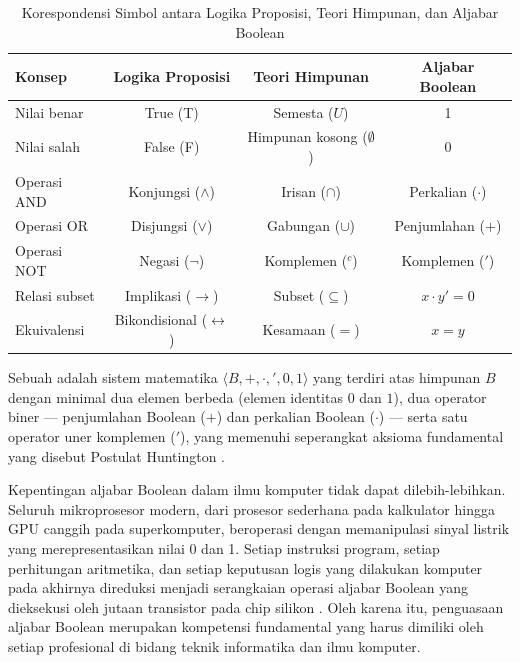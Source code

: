 \begin{table}[htbp]
\centering
\renewcommand{\arraystretch}{1.3}
\begin{tabular}{|l|c|c|c|}
\hline
\textbf{Konsep} & \textbf{Logika Proposisi} & \textbf{Teori Himpunan} & \textbf{Aljabar Boolean} \\ \hline
Nilai benar & True (T) & Semesta ($U$) & 1 \\ \hline
Nilai salah & False (F) & Himpunan kosong ($\emptyset$) & 0 \\ \hline
Operasi AND & Konjungsi ($\wedge$) & Irisan ($\cap$) & Perkalian ($\cdot$) \\ \hline
Operasi OR & Disjungsi ($\vee$) & Gabungan ($\cup$) & Penjumlahan ($+$) \\ \hline
Operasi NOT & Negasi ($\neg$) & Komplemen ($^c$) & Komplemen ($'$) \\ \hline
Relasi subset & Implikasi ($\rightarrow$) & Subset ($\subseteq$) & $x \cdot y' = 0$ \\ \hline
Ekuivalensi & Bikondisional ($\leftrightarrow$) & Kesamaan ($=$) & $x = y$ \\ \hline
\end{tabular}
\caption{Korespondensi Simbol antara Logika Proposisi, Teori Himpunan, dan Aljabar Boolean}
\label{tab:korespondensi-tiga-sistem}
\end{table}

\begin{definisi}
Sebuah  adalah sistem matematika $\langle B, +, \cdot, ', 0, 1 \rangle$ yang terdiri atas himpunan $B$ dengan minimal dua elemen berbeda (elemen identitas $0$ dan $1$), dua operator biner --- penjumlahan Boolean ($+$) dan perkalian Boolean ($\cdot$) --- serta satu operator uner komplemen ($'$), yang memenuhi seperangkat aksioma fundamental yang disebut Postulat Huntington \cite{rosen2019}.
\end{definisi}

Kepentingan aljabar Boolean dalam ilmu komputer tidak dapat dilebih-lebihkan. Seluruh mikroprosesor modern, dari prosesor sederhana pada kalkulator hingga GPU canggih pada superkomputer, beroperasi dengan memanipulasi sinyal listrik yang merepresentasikan nilai 0 dan 1. Setiap instruksi program, setiap perhitungan aritmetika, dan setiap keputusan logis yang dilakukan komputer pada akhirnya direduksi menjadi serangkaian operasi aljabar Boolean yang dieksekusi oleh jutaan transistor pada chip silikon \cite{allaboutcircuits_boolean}. Oleh karena itu, penguasaan aljabar Boolean merupakan kompetensi fundamental yang harus dimiliki oleh setiap profesional di bidang teknik informatika dan ilmu komputer.
